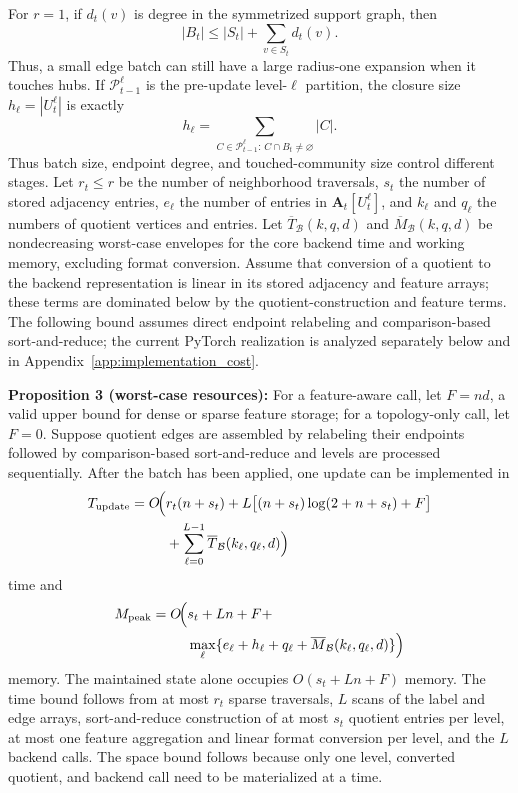 \documentclass{ieeeaccess}
\begin{document}
For $r=1$, if $d_t(v)$ is degree in the symmetrized support graph, then
\begin{equation}
|B_t|\le |S_t|+\sum_{v\in S_t}d_t(v).
\label{eq:r1_bound}
\end{equation}
Thus, a small edge batch can still have a large radius-one expansion when it
touches hubs. If $\mathcal{P}_{t-1}^\ell$ is the pre-update level-$\ell$
partition, the closure size $h_\ell=|U_t^\ell|$ is exactly
\begin{equation}
h_\ell=\sum_{C\in\mathcal{P}_{t-1}^\ell:\,C\cap B_t\ne\varnothing}|C|.
\label{eq:closure_size}
\end{equation}
Thus batch size, endpoint degree, and touched-community size control different
stages. Let $r_t\le r$ be the number of neighborhood traversals, $s_t$ the
number of stored adjacency entries, $e_\ell$ the number of entries in
$\bm A_t[U_t^\ell]$, and $k_\ell$ and $q_\ell$ the numbers of quotient
vertices and entries. Let
$\overline T_{\mathcal B}(k,q,d)$ and
$\overline M_{\mathcal B}(k,q,d)$ be nondecreasing worst-case envelopes for
the core backend time and working memory, excluding format conversion. Assume
that conversion of a quotient to the backend representation is linear in its
stored adjacency and feature arrays; these terms are dominated below by the
quotient-construction and feature terms. The following bound assumes direct
endpoint relabeling and comparison-based sort-and-reduce; the current PyTorch
realization is analyzed separately below and in
Appendix~\ref{app:implementation_cost}.

\noindent\textbf{Proposition 3 (worst-case resources):} For a feature-aware
call, let $F=nd$, a valid upper bound for dense or sparse feature storage; for
a topology-only call, let $F=0$. Suppose quotient edges
are assembled by relabeling their endpoints followed by comparison-based
sort-and-reduce and levels are processed sequentially. After the batch has been
applied, one update can be implemented in
\begin{equation}
\begin{aligned}
T_{\mathrm{update}}=O\!\Bigl(&r_t(n+s_t)
+L\bigl[(n+s_t)\log(2+n+s_t)+F\bigr]\\
&{}+\sum_{\ell=0}^{L-1}\overline T_{\mathcal B}(k_\ell,q_\ell,d)\Bigr)
\end{aligned}
\label{eq:update_time_bound}
\end{equation}
time and
\begin{equation}
\begin{aligned}
M_{\mathrm{peak}}=O\!\Bigl(&s_t+Ln+F+\\
&\max_\ell\{e_\ell+h_\ell+q_\ell
+\overline M_{\mathcal B}(k_\ell,q_\ell,d)\}\Bigr)
\end{aligned}
\label{eq:peak_space_bound}
\end{equation}
memory. The maintained state alone occupies $O(s_t+Ln+F)$ memory. The time
bound follows from at most $r_t$ sparse traversals, $L$ scans of the label and
edge arrays, sort-and-reduce construction of at most $s_t$ quotient entries per
level, at most one feature aggregation and linear format conversion per level,
and the $L$ backend calls. The space bound follows because only one level,
converted quotient, and backend call need to be materialized at a time.
\end{document}
